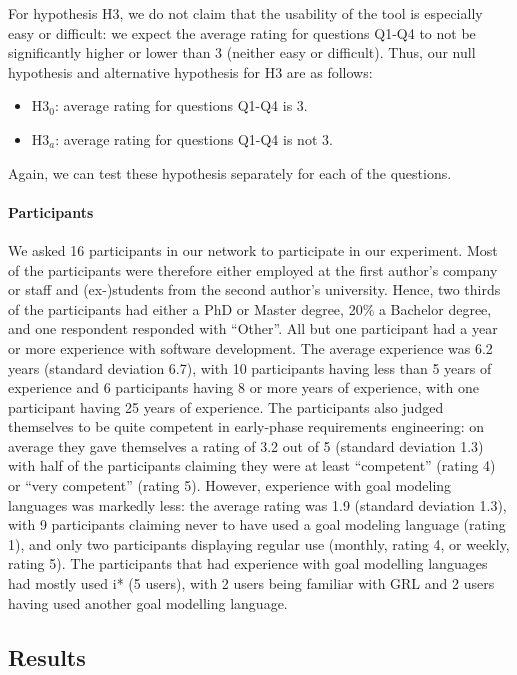 For hypothesis H3, we do not claim that the usability of the tool is especially easy or difficult: we expect the average rating for questions Q1-Q4 to not be significantly higher or lower than 3 (neither easy or difficult). Thus, our null hypothesis and alternative hypothesis for H3 are as follows:  
\begin{itemize}
\item H3$_{0}$: average rating for questions Q1-Q4 is 3.
\item H3$_{a}$: average rating for questions Q1-Q4 is not 3.
\end{itemize}
Again, we can test these hypothesis separately for each of the questions.

\paragraph{Participants}
We asked 16 participants in our network to participate in our experiment. Most of the participants were therefore either employed at the first author's company or staff and (ex-)students from the second author's university. Hence, two thirds of the participants had either a PhD or Master degree, 20\% a Bachelor degree, and one respondent responded with ``Other''. All but one participant had a year or more experience with software development. The average experience was 6.2 years (standard deviation 6.7), with 10 participants having less than 5 years of experience and 6 participants having 8 or more years of experience, with one participant having 25 years of experience. The participants also judged themselves to be quite competent in  early-phase requirements engineering: on average they gave themselves a rating of 3.2 out of 5 (standard deviation 1.3) with half of the participants claiming they were at least ``competent'' (rating 4) or ``very competent'' (rating 5). However, experience with goal modeling languages was markedly less: the average rating was 1.9 (standard deviation 1.3), with 9 participants claiming never to have used a goal modeling language (rating 1), and only two participants displaying regular use (monthly, rating 4, or weekly, rating 5). The participants that had experience with goal modelling languages had mostly used i* (5 users), with 2 users being familiar with GRL and 2 users having used another goal modelling language.

\subsection{Results}\label{sec:survey:results}

